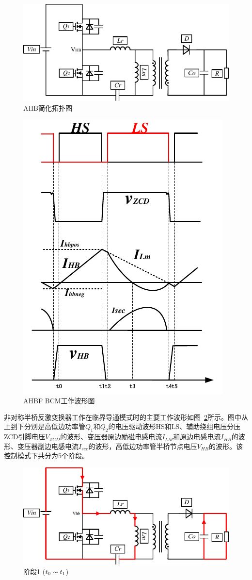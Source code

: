 \begin{figure}[htbp] 
    \centering
    \includegraphics[width=0.6\linewidth]{figures/AHB简化拓扑图.pdf}
    \caption{AHB简化拓扑图}
    \label{fig:AHB简化拓扑图}
\end{figure}

\begin{figure}[htbp] 
    \centering
    \includegraphics[width=0.6\linewidth]{figures/BCM工作波形图.pdf}
    \caption{AHBF BCM工作波形图}
    \label{fig:BCM工作波形图}
\end{figure}
								
非对称半桥反激变换器工作在临界导通模式时的主要工作波形如图~\ref{fig:BCM工作波形图}所示。图中从上到下分别是高低边功率管$Q_1$和$Q_2$的电压驱动波形HS和LS、辅助绕组电压分压ZCD引脚电压$V_{ZCD}$的波形、变压器原边励磁电感电流$I_{LM}$和原边电感电流$I_{HB}$的波形、变压器副边电感电流$I_{sec}$的波形，高低边功率管半桥节点电压$V_{HB}$的波形。该控制模式下共分为5个阶段。
						


\begin{figure}[htbp] 
    \centering
    \includegraphics[width=0.6\linewidth]{figures/工作原理1.pdf}
    \caption{阶段1 ($t_0 \thicksim t_1$)}
    \label{fig:工作原理1}
\end{figure}
                
